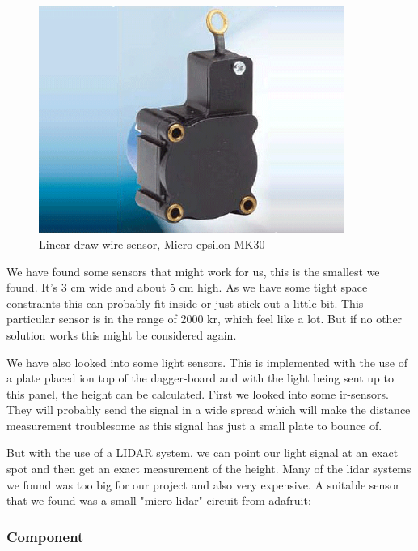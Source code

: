 \begin{figure}[H]
\begin{center}
	\includegraphics[width = 10cm]{Figures/microepsilon_mk30.png}
	\caption{Linear draw wire sensor, Micro epsilon MK30}
	\label{Draw_sensor}
\end{center}
\end{figure}
 
We have found some sensors that might work for us, this is the smallest we found. It's 3 cm wide and about 5 cm high. As we have some tight space constraints this can probably fit inside or just stick out a little bit. This particular sensor is in the range of 2000 kr, which feel like a lot. But if no other solution works this might be considered again.  


We have also looked into some light sensors. This is implemented with the use of a plate placed ion top of the dagger-board and with the light being sent up to this panel, the height can be calculated. First we looked into some ir-sensors. They will probably send the signal in a wide spread which will make the distance measurement troublesome as this signal has just a small plate to bounce of.  
  

But with the use of a LIDAR system, we can point our light signal at an exact spot and then get an exact measurement of the height.  
Many of the lidar systems we found was too big for our project and also very expensive.  
A suitable sensor that we found was a small "micro lidar" circuit from adafruit: 




\subsubsection{Component}



